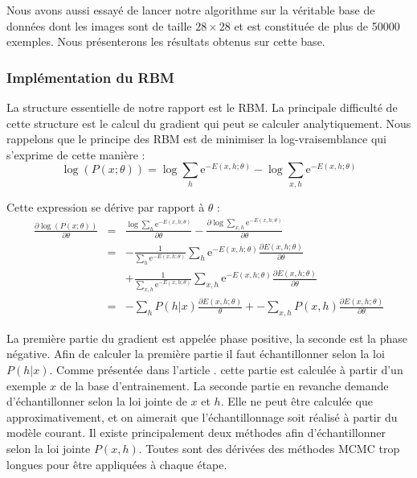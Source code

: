 \documentclass[10pt,a4paper]{article}
\begin{document}
Nous avons aussi essayé de lancer notre algorithme sur la véritable base de données dont les images sont de taille $28 \times 28$ et est constituée de plus de 50000 exemples. Nous présenterons les résultats obtenus sur cette base. 


\subsubsection{Implémentation du RBM}


La structure essentielle de notre rapport est le RBM. La principale difficulté de cette structure est le calcul du gradient qui peut se calculer analytiquement. Nous rappelons que le principe des RBM est de minimiser la log-vraisemblance qui s'exprime de cette manière :
\begin{equation}
	\log \left( P(x; \theta) \right) = \log \sum_h \mathrm{e}^{-E(x, h; \theta)} - \log \sum_{x, h} \mathrm{e}^{-E(x, h; \theta)}
\end{equation}


Cette expression se dérive par rapport à $\theta$ :
\begin{equation}
	\begin{array}{rll}
		 \displaystyle\frac{\partial \log \left ( P(x; \theta) \right )}{\partial \theta} & = & \displaystyle\frac{\log \sum_h \mathrm{e}^{-E(x, h; \theta)}}{\partial \theta} - \frac{\partial \log \sum_{x, h} \mathrm{e}^{-E(x, h; \theta)}}{\partial \theta} \\
		 &=&  \displaystyle-\frac{1}{\sum_h \mathrm{e}^{-E(x, h; \theta)}} \sum_h \mathrm{e}^{-E(x, h; \theta)} \frac{\partial E(x, h; \theta)}{\partial\theta} \\
		 & &  \displaystyle+ \frac{1}{\sum_{x, h} \mathrm{e}^{-E(x, h; \theta)}} \sum_{x, h} \mathrm{e}^{-E(x, h; \theta)} \frac{\partial E(x, h; \theta)}{\partial\theta} \\
		 &=&  \displaystyle- \sum_{h} P(h|x) \frac{\partial E(x, h; \theta)}{\theta} + - \sum_{x, h} P(x, h) \frac{\partial E(x, h; \theta)}{\partial\theta} 
	\end{array}
\end{equation}


La première partie du gradient est appelée phase positive, la seconde est la phase négative. Afin de calculer la première partie il faut échantillonner selon la loi $P(h|x)$. Comme présentée dans l'article \cite{HIN1984}. cette partie est calculée à partir d'un exemple $x$ de la base d'entrainement. La seconde partie en revanche demande d'échantillonner selon la loi jointe de $x$ et $h$. Elle ne peut être calculée que approximativement, et on aimerait que l'échantillonnage soit réalisé à partir du modèle courant. Il existe principalement deux méthodes afin d'échantillonner selon la loi jointe $P(x, h)$. Toutes sont des dérivées des méthodes MCMC trop longues pour être appliquées à chaque étape.
\end{document}
